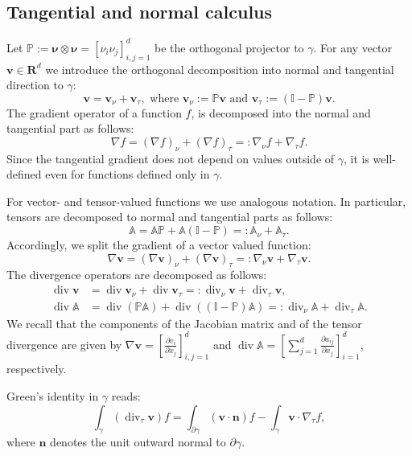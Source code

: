 \documentclass[a4paper]{article}
\numberwithin{equation}{section}
\def\div{\operatorname{div}}
\def\nn{\vc n}
\def\nnu{\boldsymbol\nu}
\def\prtl{\partial}
\def\Real{{\mathbf R}} %
\def\tn#1{{\mathbb{#1}}}    %
\def\vc#1{\mathbf{#1}}     %
\def\vv{\vc v}
\newcommand{\eqs}[1]{\begin{equation*}#1\end{equation*}}
\begin{document}
\subsection{Tangential and normal calculus}
Let $\tn P := \nnu\otimes\nnu = [\nu_i\nu_j]_{i,j=1}^d$ be the orthogonal projector to $\gamma$.
For any vector $\vv\in\Real^d$ we introduce the orthogonal decomposition into normal and tangential direction to $\gamma$:
\eqs{ \vv = \vv_\nu + \vv_\tau, \mbox{ where } \vv_\nu := \tn P\vv \mbox{ and } \vv_\tau := (\tn I-\tn P)\vv. }
The gradient operator of a function $f$, is decomposed into the normal and tangential part as follows:
\eqs{ \nabla f = (\nabla f)_\nu + (\nabla f)_\tau =: \nabla_\nu f + \nabla_\tau f. }
Since the tangential gradient does not depend on values outside of $\gamma$, it is well-defined even for functions defined only in $\gamma$.

For vector- and tensor-valued functions we use analogous notation.
In particular, tensors are decomposed to normal and tangential parts as follows:
\eqs{ \tn A = \tn A\tn P + \tn A(\tn I-\tn P) =: \tn A_\nu + \tn A_\tau. }
Accordingly, we split the gradient of a vector valued function:
\eqs{ \nabla\vv = (\nabla\vv)_\nu + (\nabla\vv)_\tau =: \nabla_\nu\vv + \nabla_\tau\vv. }
The divergence operators are decomposed as follows:
\begin{align*}
\div\vv &= \div\vv_\nu + \div\vv_\tau =: \div_\nu\vv + \div_\tau\vv,\\
\div\tn A &= \div(\tn P\tn A) + \div((\tn I-\tn P)\tn A) =: \div_\nu\tn A + \div_\tau\tn A.
\end{align*}
We recall that the components of the Jacobian matrix and of the tensor divergence are given by $\nabla\vv=\left[\tfrac{\prtl v_i}{\prtl x_j}\right]_{i,j=1}^d$ and $\div\tn A = \left[\sum_{j=1}^d\tfrac{\prtl a_{ij}}{\prtl x_j}\right]_{i=1}^d$, respectively.

Green's identity in $\gamma$ reads:
\eqs{ \int_\gamma(\div_\tau\vv)f = \int_{\prtl\gamma}(\vv\cdot\nn)f - \int_\gamma\vv\cdot\nabla_\tau f, }
where $\nn$ denotes the unit outward normal to $\partial\gamma$.
\end{document}
